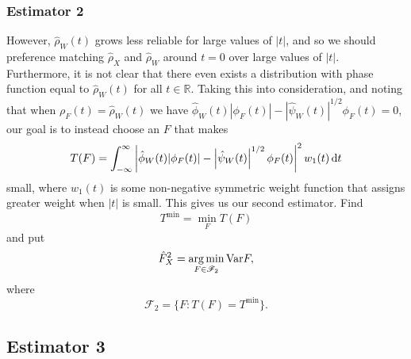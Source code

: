 	\subsubsection{Estimator 2}
	However, $\hat{\rho}_W(t)$ grows less reliable for large values of $|t|$, and so we should preference matching $\hat{\rho}_X$ and $\hat{\rho}_W$ around $t = 0$ over large values of $|t|$. Furthermore, it is not clear that there even exists a distribution with phase function equal to $\hat{\rho}_W(t)$ for all $t \in \mathbb{R}$. Taking this into consideration, and noting that when $\rho_F(t) = \hat{\rho}_W(t)$ we have $\hat{\phi}_W(t) |\phi_F(t)| - \left|\hat{\psi}_W(t)\right|^{1/2} \phi_F(t) = 0$, our goal is to instead choose an $F$ that makes
	\begin{equation}
		T(F) = \int_{-\infty}^\infty \left| \hat{\phi}_W(t) |\phi_F(t)| - \left|\hat{\psi}_W(t)\right|^{1/2} \phi_F(t) \right|^2 w_1(t) \, \mathrm{d} t
	\end{equation}
	small,
	where $w_1(t)$ is some non-negative symmetric weight function that assigns greater weight when $|t|$ is small. This gives us our second estimator.
	Find 
	\begin{equation}
		T^\mathrm{min} = \min_F T(F)
	\end{equation}
	and put
	\begin{equation}
		\hat{F}_X^2 = \operatorname*{arg\,min}_{F \in \mathscr{F}_2} \mathrm{Var}{F},
	\end{equation}
	where
	\begin{equation}
		\mathscr{F}_2 = \{F: T(F) = T^\mathrm{min}\}.
	\end{equation}

	\subsection{Estimator 3}


